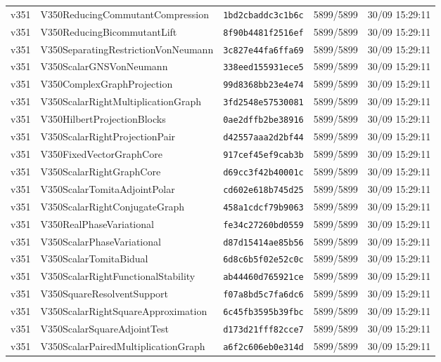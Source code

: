 \documentclass[11pt]{article}
\theoremstyle{definition}\newtheorem{deriv}{Derivação}
\begin{document}
{\begin{longtable}{@{}lllll@{}}
v351 & V350ReducingCommutantCompression & \texttt{1bd2cbaddc3c1b6c} & 5899/5899 & 30/09 15:29:11 \\
v351 & V350ReducingBicommutantLift & \texttt{8f90b4481f2516ef} & 5899/5899 & 30/09 15:29:11 \\
v351 & V350SeparatingRestrictionVonNeumann & \texttt{3c827e44fa6ffa69} & 5899/5899 & 30/09 15:29:11 \\
v351 & V350ScalarGNSVonNeumann & \texttt{338eed155931ece5} & 5899/5899 & 30/09 15:29:11 \\
v351 & V350ComplexGraphProjection & \texttt{99d8368bb23e4e74} & 5899/5899 & 30/09 15:29:11 \\
v351 & V350ScalarRightMultiplicationGraph & \texttt{3fd2548e57530081} & 5899/5899 & 30/09 15:29:11 \\
v351 & V350HilbertProjectionBlocks & \texttt{0ae2dffb2be38916} & 5899/5899 & 30/09 15:29:11 \\
v351 & V350ScalarRightProjectionPair & \texttt{d42557aaa2d2bf44} & 5899/5899 & 30/09 15:29:11 \\
v351 & V350FixedVectorGraphCore & \texttt{917cef45ef9cab3b} & 5899/5899 & 30/09 15:29:11 \\
v351 & V350ScalarRightGraphCore & \texttt{d69cc3f42b40001c} & 5899/5899 & 30/09 15:29:11 \\
v351 & V350ScalarTomitaAdjointPolar & \texttt{cd602e618b745d25} & 5899/5899 & 30/09 15:29:11 \\
v351 & V350ScalarRightConjugateGraph & \texttt{458a1cdcf79b9063} & 5899/5899 & 30/09 15:29:11 \\
v351 & V350RealPhaseVariational & \texttt{fe34c27260bd0559} & 5899/5899 & 30/09 15:29:11 \\
v351 & V350ScalarPhaseVariational & \texttt{d87d15414ae85b56} & 5899/5899 & 30/09 15:29:11 \\
v351 & V350ScalarTomitaBidual & \texttt{6d8c6b5f02e52c0c} & 5899/5899 & 30/09 15:29:11 \\
v351 & V350ScalarRightFunctionalStability & \texttt{ab44460d765921ce} & 5899/5899 & 30/09 15:29:11 \\
v351 & V350SquareResolventSupport & \texttt{f07a8bd5c7fa6dc6} & 5899/5899 & 30/09 15:29:11 \\
v351 & V350ScalarRightSquareApproximation & \texttt{6c45fb3595b39fbc} & 5899/5899 & 30/09 15:29:11 \\
v351 & V350ScalarSquareAdjointTest & \texttt{d173d21fff82cce7} & 5899/5899 & 30/09 15:29:11 \\
v351 & V350ScalarPairedMultiplicationGraph & \texttt{a6f2c606eb0e314d} & 5899/5899 & 30/09 15:29:11 \\

\end{longtable}}
\end{document}
